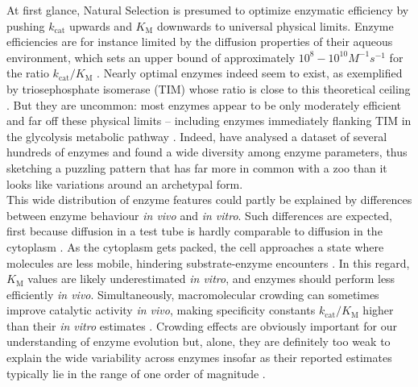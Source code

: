 \documentclass[nogrid,crop,final]{MBE2}%
\begin{document}
At first glance, Natural Selection is presumed to optimize enzymatic efficiency by pushing $k_\text{cat}$ upwards and $K_\text{M}$ downwards to universal physical limits. Enzyme efficiencies are for instance limited by the diffusion properties of their aqueous environment, which sets an upper bound of approximately $10^8-10^{10} M^{-1}s^{-1}$ for the ratio ${k_\text{cat}}/{K_\text{M}}$  \citep{Alberty58,Zhou82}. Nearly optimal enzymes indeed seem to exist, as exemplified by triosephosphate isomerase (TIM) whose ratio is close to this theoretical ceiling \citep{Knowles77}. But they are uncommon: most enzymes appear to be only moderately efficient and far off these physical limits -- including enzymes immediately flanking TIM in the glycolysis metabolic pathway \citep{Davidi18}.
Indeed, \citet{Bar-Even11} have analysed a dataset of several hundreds of enzymes and found a wide diversity among enzyme parameters, thus sketching a puzzling pattern that has far more in common with a zoo than it looks like variations around an archetypal form.\\


This wide distribution of enzyme features could partly be explained by differences between enzyme behaviour \textit{in vivo} and \textit{in vitro}. Such differences are expected, first because diffusion in a test tube is hardly comparable to diffusion in the cytoplasm \citep{Ellis01,Rivas04,Zhou08,Rivas18}. As the cytoplasm gets packed, the cell approaches a state where molecules are less mobile, hindering substrate-enzyme encounters \citep{Muramatsu88,Zimmerman93,Blanco18}. In this regard, $K_\text{M}$ values are likely underestimated \textit{in vitro}, and enzymes should perform less efficiently \textit{in vivo}. Simultaneously, macromolecular crowding can sometimes improve catalytic activity \textit{in vivo}, making specificity constants $k_\text{cat}/K_\text{M}$ higher than their \textit{in vitro} estimates \citep{Ralston90,Ellis01,Jiang07,Pozdnyakova10}. Crowding effects are obviously important for our understanding of enzyme evolution but, alone, they are definitely too weak to explain the wide variability across enzymes insofar as their reported estimates typically lie in the range of one order of magnitude \citep{Davidi16}. \\%
\end{document}
